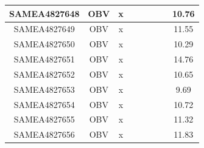 \documentclass[../main.tex]{subfiles}
\begin{document}
\begin{flushleft}
\begin{footnotesize}
\begin{longtable}{|c|c|c|c|c|c|c|}
    \hline
    SAMEA4827648  & OBV   & x                                                            & ~          & ~                                                                           & ~                                                                 & 10.76     \\ 
    \hline
    SAMEA4827649  & OBV   & x                                                            & ~          & ~                                                                           & ~                                                                 & 11.55     \\ 
    \hline
    SAMEA4827650  & OBV   & x                                                            & ~          & ~                                                                           & ~                                                                 & 10.29     \\ 
    \hline
    SAMEA4827651  & OBV   & x                                                            & ~          & ~                                                                           & ~                                                                 & 14.76     \\ 
    \hline
    SAMEA4827652  & OBV   & x                                                            & ~          & ~                                                                           & ~                                                                 & 10.65     \\ 
    \hline
    SAMEA4827653  & OBV   & x                                                            & ~          & ~                                                                           & ~                                                                 & 9.69      \\ 
    \hline
    SAMEA4827654  & OBV   & x                                                            & ~          & ~                                                                           & ~                                                                 & 10.72     \\ 
    \hline
    SAMEA4827655  & OBV   & x                                                            & ~          & ~                                                                           & ~                                                                 & 11.32     \\ 
    \hline
    SAMEA4827656  & OBV   & x                                                            & ~          & ~                                                                           & ~                                                                 & 11.83     \\ 

\end{longtable}
\end{footnotesize}
\end{flushleft}
\end{document}
